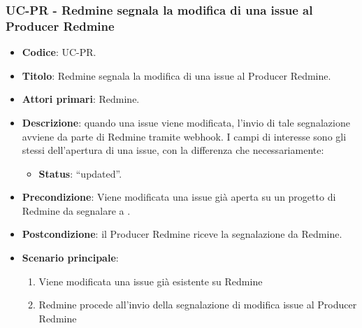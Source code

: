 	\subsubsection{UC\theuccount-PR - Redmine segnala la modifica di una issue al Producer Redmine}
	\begin{itemize}
		\item \textbf{Codice}: UC\theuccount-PR.
		\item \textbf{Titolo}: Redmine segnala la modifica di una issue al Producer Redmine.
		\item \textbf{Attori primari}: Redmine.
		\item \textbf{Descrizione}: quando una issue viene modificata, l'invio di tale segnalazione
		avviene da parte di Redmine tramite webhook.
		I campi di interesse sono gli stessi dell'apertura di una issue, con la differenza che necessariamente:
		\begin{itemize}
			\item \textbf{Status}: ``updated''.
		\end{itemize}
		\item \textbf{Precondizione}: Viene modificata una issue già aperta su un
		progetto di Redmine da segnalare a \progetto.
		\item \textbf{Postcondizione}: il Producer Redmine riceve la segnalazione da Redmine.
		\item \textbf{Scenario principale}: 
		\begin{enumerate}
			\item Viene modificata una issue già esistente su Redmine
			\item Redmine procede all'invio della segnalazione di modifica issue al Producer Redmine
		\end{enumerate}
		
	\end{itemize}